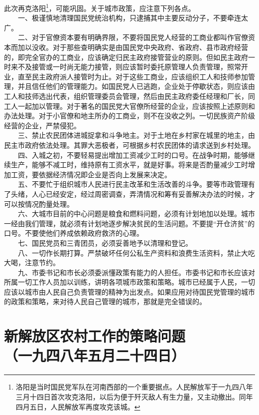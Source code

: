 \documentclass[cn,11pt,chinese]{elegantbook}
\def\myformat#1{\hfil\hfil #1}
\begin{document}
此次再克洛阳\footnote[1]{ 洛阳是当时国民党军队在河南西部的一个重要据点。人民解放军于一九四八年三月十四日首次攻克洛阳，以后为便于歼灭敌人有生力量，又主动撤出。同年四月五日，人民解放军再度攻克该城。}，可能巩固。关于城市政策，应注意下列各点。\\
　　一、极谨慎地清理国民党统治机构，只逮捕其中主要反动分子，不要牵连太广。\\
　　二、对于官僚资本要有明确界限，不要将国民党人经营的工商业都叫作官僚资本而加以没收。对于那些查明确实是由国民党中央政府、省政府、县市政府经营的，即完全官办的工商业，应该确定归民主政府接管营业的原则。但如民主政府一时来不及接管或一时尚无能力接管，则应该暂时委托原管理人负责管理，照常开业，直至民主政府派人接管时为止。对于这些工商业，应该组织工人和技师参加管理，并且信任他们的管理能力。如国民党人已逃跑，企业处于停歇状态，则应该由工人和技师选出代表，组织管理委员会管理，然后由民主政府委任经理和厂长，同工人一起加以管理。对于著名的国民党大官僚所经营的企业，应该按照上述原则和办法处理。对于小官僚和地主所办的工商业，则不在没收之列。一切民族资产阶级经营的企业，严禁侵犯。\\
　　三、禁止农民团体进城捉拿和斗争地主。对于土地在乡村家在城里的地主，由民主市政府依法处理。其罪大恶极者，可根据乡村农民团体的请求送到乡村处理。\\
　　四、入城之初，不要轻易提出增加工资减少工时的口号。在战争时期，能够继续生产，能够不减工时，维持原有工资水平，就是好事。将来是否酌量减少工时增加工资，要依据经济情况即企业是否向上发展来决定。\\
　　五、不要忙于组织城市人民进行民主改革和生活改善的斗争。要等市政管理有了头绪，人心已经安定，经过周密调查，弄清情况和筹有妥善解决办法的时候，才可以按情况酌量处理。\\
　　六、大城市目前的中心问题是粮食和燃料问题，必须有计划地加以处理。城市一经由我们管理，就必须有计划地逐步解决贫民的生活问题。不要提“开仓济贫”的口号。不要使他们养成依赖政府救济的心理。\\
　　七、国民党员和三青团员，必须妥善地予以清理和登记。\\
　　八、一切作长期打算。严禁破坏任何公私生产资料和浪费生活资料，禁止大吃大喝，注意节约。\\
　　九、市委书记和市长必须委派懂政策有能力的人担任。市委书记和市长应该对所属一切工作人员加以训练，讲明各项城市政策和策略。城市已经属于人民，一切应该以城市由人民自己负责管理的精神为出发点。如果应用对待国民党管理的城市的政策和策略，来对待人民自己管理的城市，那就是完全错误的。\\
\newpage\section*{\myformat{新解放区农村工作的策略问题}\\\myformat{（一九四八年五月二十四日）}}
\end{document}
